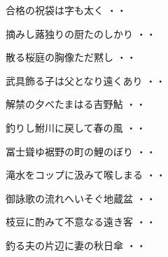 \vspace{0.6cm}
\begin{shiika}合格の祝袋は字も太く
\hfill{・・}\end{shiika}
\vspace{0.6cm}
\begin{shiika}摘みし蕗独りの厨たのしかり
\hfill{・・}\end{shiika}
\vspace{0.6cm}
\begin{shiika}散る桜庭の胸像ただ黙し
\hfill{・・}\end{shiika}
\vspace{0.6cm}
\begin{shiika}武具飾る子は父となり遠くあり
\hfill{・・}\end{shiika}
\vspace{0.6cm}
\begin{shiika}解禁の夕べたまはる吉野鮎
\hfill{・・}\end{shiika}
\vspace{0.6cm}
\begin{shiika}釣りし鮒川に戻して春の風
\hfill{・・}\end{shiika}
\vspace{0.6cm}
\begin{shiika}冨士聳ゆ裾野の町の鯉のぼり
\hfill{・・}\end{shiika}
\vspace{0.6cm}
\begin{shiika}滝水をコップに汲みて喉しまる
\hfill{・・}\end{shiika}
\vspace{0.6cm}
\begin{shiika}御詠歌の流れへいそぐ地蔵盆
\hfill{・・}\end{shiika}
\vspace{0.6cm}
\begin{shiika}枝豆に酌みて不意なる遠き客
\hfill{・・}\end{shiika}
\vspace{0.6cm}
\begin{shiika}釣る夫の片辺に妻の秋日傘
\hfill{・・}\end{shiika}
